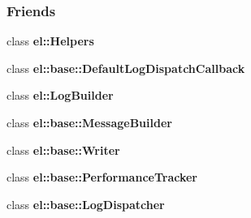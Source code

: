 \subsubsection*{Friends}
\begin{DoxyCompactItemize}
\item 
\hypertarget{a00086_a2fb8a2c02cbf86247f093c118bed877a}{}class {\bfseries el\+::\+Helpers}\label{a00086_a2fb8a2c02cbf86247f093c118bed877a}

\item 
\hypertarget{a00086_a42b1de96d584ae4fecbfc2b9aff95052}{}class {\bfseries el\+::base\+::\+Default\+Log\+Dispatch\+Callback}\label{a00086_a42b1de96d584ae4fecbfc2b9aff95052}

\item 
\hypertarget{a00086_a8c584bcf767a4d007311a7408b22ad62}{}class {\bfseries el\+::\+Log\+Builder}\label{a00086_a8c584bcf767a4d007311a7408b22ad62}

\item 
\hypertarget{a00086_a81bbf6fe31fab133d182efa8367304f1}{}class {\bfseries el\+::base\+::\+Message\+Builder}\label{a00086_a81bbf6fe31fab133d182efa8367304f1}

\item 
\hypertarget{a00086_a7a728edbb2761d151832daa74d5b2736}{}class {\bfseries el\+::base\+::\+Writer}\label{a00086_a7a728edbb2761d151832daa74d5b2736}

\item 
\hypertarget{a00086_a6a4d7851e1984800be3c230f06a79528}{}class {\bfseries el\+::base\+::\+Performance\+Tracker}\label{a00086_a6a4d7851e1984800be3c230f06a79528}

\item 
\hypertarget{a00086_a9b37b28ea1c5f8f862cc89f135711d92}{}class {\bfseries el\+::base\+::\+Log\+Dispatcher}\label{a00086_a9b37b28ea1c5f8f862cc89f135711d92}

\end{DoxyCompactItemize}
